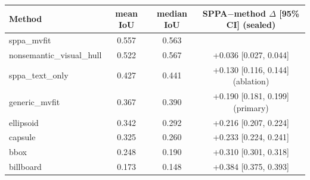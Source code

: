 \begin{tabular}{lccc}
\toprule
Method & mean IoU & median IoU & SPPA$-$method $\Delta$ [95\% CI] (sealed) \\
\midrule
sppa\_mvfit & 0.557 & 0.563 &  \\
nonsemantic\_visual\_hull & 0.522 & 0.567 & +0.036 [0.027, 0.044] \\
sppa\_text\_only & 0.427 & 0.441 & +0.130 [0.116, 0.144] (ablation) \\
generic\_mvfit & 0.367 & 0.390 & +0.190 [0.181, 0.199] (primary) \\
ellipsoid & 0.342 & 0.292 & +0.216 [0.207, 0.224] \\
capsule & 0.325 & 0.260 & +0.233 [0.224, 0.241] \\
bbox & 0.248 & 0.190 & +0.310 [0.301, 0.318] \\
billboard & 0.173 & 0.148 & +0.384 [0.375, 0.393] \\
\bottomrule
\end{tabular}
